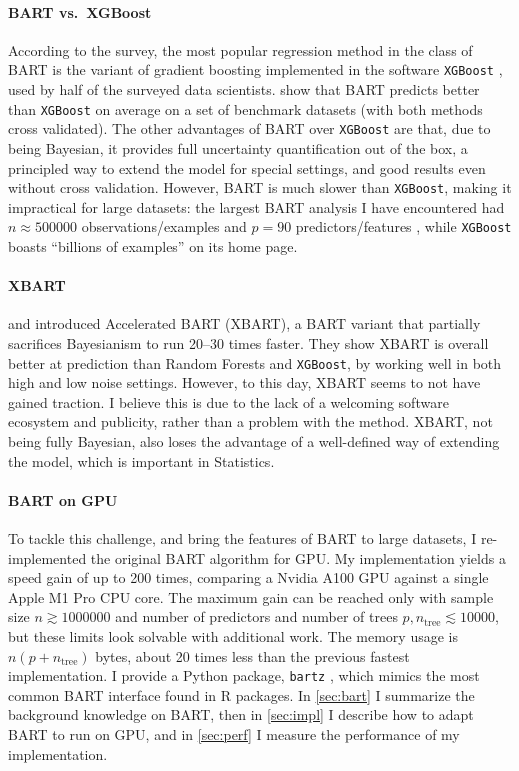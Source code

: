\documentclass{article}
\begin{document}
    \paragraph{BART vs.\ XGBoost}

    According to the \textcite[p.~35]{kaggle2021} survey, the most popular regression method in the class of BART is the variant of gradient boosting implemented in the software \texttt{XGBoost} \autocite{chen2016}, used by half of the surveyed data scientists. \textcite[table~2, p.~1105]{linero2018b} show that BART predicts better than \texttt{XGBoost} on average on a set of benchmark datasets (with both methods cross validated). The other advantages of BART over \texttt{XGBoost} are that, due to being Bayesian, it provides full uncertainty quantification out of the box, a principled way to extend the model for special settings, and good results even without cross validation. However, BART is much slower than \texttt{XGBoost}, making it impractical for large datasets: the largest BART analysis I have encountered had $n\approx\num{500000}$ observations/examples and $p=90$ predictors/features \autocite{pratola2020}, while \texttt{XGBoost} boasts ``billions of examples'' on its home page.

    \paragraph{XBART}

    \textcite{he2019} and \textcite{he2021} introduced Accelerated BART (XBART), a BART variant that partially sacrifices Bayesianism to run 20--30 times faster. They show XBART is overall better at prediction than Random Forests and \texttt{XGBoost}, by working well in both high and low noise settings. However, to this day, XBART seems to not have gained traction. I believe this is due to the lack of a welcoming software ecosystem and publicity, rather than a problem with the method. XBART, not being fully Bayesian, also loses the advantage of a well-defined way of extending the model, which is important in Statistics.

    \paragraph{BART on GPU}

    To tackle this challenge, and bring the features of BART to large datasets, I re-implemented the original BART algorithm for GPU. My implementation yields a speed gain of up to 200 times, comparing a Nvidia A100 GPU against a single Apple M1 Pro CPU core. The maximum gain can be reached only with sample size $n \gtrsim \num{1000000}$ and  number of predictors and number of trees $p,n_\text{tree}\lesssim\num{10000}$, but these limits look solvable with additional work. The memory usage is $n(p+n_\text{tree})$ bytes, about 20 times less than the previous fastest implementation. I provide a Python package, \texttt{bartz} \autocite{petrillo2024b}, which mimics the most common BART interface found in R packages. In \autoref{sec:bart} I summarize the background knowledge on BART, then in \autoref{sec:impl} I describe how to adapt BART to run on GPU, and in \autoref{sec:perf} I measure the performance of my implementation.
\end{document}
